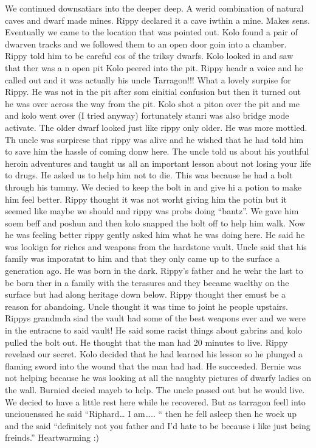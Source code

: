 We continued downsatiars into the deeper deep. A werid combination of natural caves and dwarf made mines. Rippy declared it a cave iwthin a mine. Makes sens. Eventually we came to the location that was pointed out. Kolo found a pair of dwarven tracks and we followed them to an open door goin into a chamber. Rippy told him to be careful cos of the triksy dwarfs. Kolo looked in and saw that ther was a n open pit Kolo peered into the pit. Rippy headr a voice and he called out and it was actually his uncle Tarragon!!! What a lovely surpise for Rippy. He was not in the pit after som einitial confusion but then it turned out he was over across the way from the pit. Kolo shot a piton over the pit and me and kolo went over (I tried anyway) fortunately stanri was also bridge mode activate. The older dwarf looked just like rippy only older. He was more mottled. Th uncle was surpirese that rippy was alive and he wished that he had told him to save him the hassle of coming donw here. The uncle told us about his youthful heroin adventures and taught us all an important lesson about not losing your life to drugs. He asked us to help him not to die. This was because he had a bolt through his tummy. We decied to keep the bolt in and give hi a potion to make him feel better. Rippy thought it was not worht giving him the potin but it seemed like maybe we should and rippy was probs doing “bantz”. We gave him soem beff and poshun and then kolo snapped the bolt off to help him walk. Now he was feeling better rippy gently asked him what he was doing here. He said he was lookign for riches and weapons from the hardstone vault. Uncle said that his family was imporatnt to him and that they only came up to the surface a generation ago. He was born in the dark. Rippy’s father and he wehr the last to be born ther in a family with the terasures and they became waelthy on the surface but had along heritage down below. Rippy thought ther emust be a reason for abandoing. Uncle thought it was time to joint he people upstairs. Rippys grandmda siad the vault had some of the best weapons ever and we were in the entracne to said vault! He said some racist things about gabrins and kolo pulled the bolt out. He thought that the man had 20 minutes to live. Rippy revelaed our secret. Kolo decided that he had learned his lesson so he plunged a flaming sword into the wound that the man had had. He succeeded. Bernie was not helping because he was looking at all the naughty pictures of dwarfy ladies on the wall. Burnied decied mayeb to help. The uncle passed out but he would live. We decied to have a little rest here while he recovered. But as tarragon feell into unciouenssed he said “Riphard… I am….. “ then he fell asleep then he woek up and the said “definitely not you father and I’d hate to be because i like just being freinds.” Heartwarming :)\medskip

